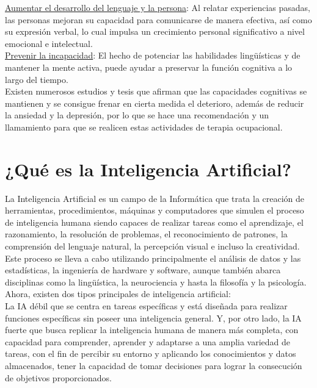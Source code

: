 \underline{Aumentar el desarrollo del lenguaje y la persona}: Al relatar experiencias pasadas, las personas mejoran su capacidad para comunicarse de manera efectiva, así como su expresión verbal, lo cual impulsa un crecimiento personal significativo a nivel emocional e intelectual.\\

\underline{Prevenir la incapacidad}: El hecho de potenciar las habilidades lingüísticas y de mantener la mente activa, puede ayudar a preservar la función cognitiva a lo largo del tiempo. \\

Existen numerosos estudios y tesis que afirman que las capacidades cognitivas se mantienen y se consigue frenar en cierta medida el deterioro, además de reducir la ansiedad y la depresión, por lo que se hace una recomendación y un llamamiento para que se realicen estas actividades de terapia ocupacional.\\

\section{¿Qué es la Inteligencia Artificial?}

La Inteligencia Artificial es un campo de la Informática que trata la creación de herramientas, procedimientos, máquinas y computadores que simulen el proceso de inteligencia humana siendo capaces de realizar tareas como el aprendizaje, el razonamiento, la resolución de problemas, el reconocimiento de patrones, la comprensión del lenguaje natural, la percepción visual e incluso la creatividad. Este proceso se lleva a cabo utilizando principalmente el análisis de datos y las estadísticas, la ingeniería de hardware y software, aunque también abarca disciplinas como la lingüística, la neurociencia y hasta la filosofía y la psicología.\\

Ahora, existen dos tipos principales de inteligencia artificial:\\
La IA débil que se centra en tareas específicas y está diseñada para realizar funciones específicas sin poseer una inteligencia general. Y, por otro lado, la IA fuerte que busca replicar la inteligencia humana de manera más completa, con capacidad para comprender, aprender y adaptarse a una amplia variedad de tareas, con el fin de percibir su entorno y aplicando los conocimientos y datos almacenados, tener la capacidad de tomar decisiones para lograr la consecución de objetivos proporcionados.\\

